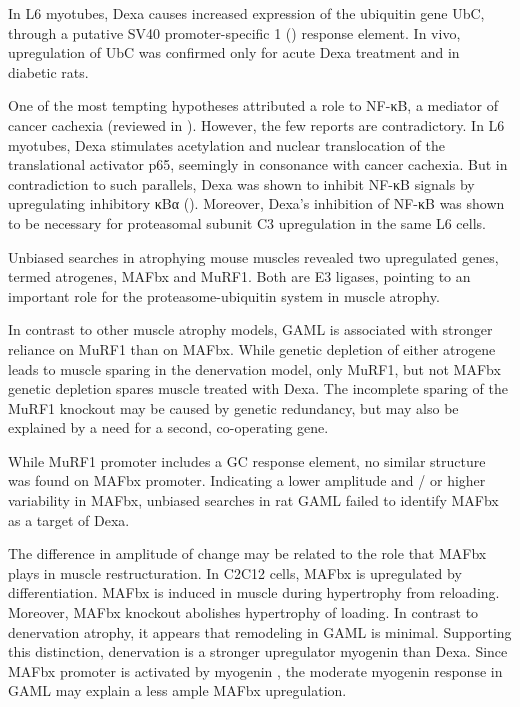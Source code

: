 \documentclass[12pt,english]{report}\usepackage[]{graphicx}\usepackage[]{color}
\begin{document}
In L6 myotubes, Dexa causes increased expression of the ubiquitin
gene UbC, through a putative SV40 promoter-specific 1 ()
response element\citep{marinovic2000tools}. In vivo, upregulation
of UbC was confirmed only for acute Dexa treatment\citep{wing1993glucocorticoids}
and in diabetic rats\citep{zheng2010foxo3a}.

One of the most tempting hypotheses attributed a role to NF-κB, a
mediator of cancer cachexia (reviewed in \citep{tisdale2008catabolic}).
However, the few reports are contradictory. In L6 myotubes, Dexa stimulates
acetylation and nuclear translocation of the translational activator
p65\citep{chamberlain2012multiple}, seemingly in consonance with
cancer cachexia. But in contradiction to such parallels, Dexa was
shown to inhibit NF-κB signals by upregulating inhibitory κBα ()\citep{luo2001heat}.
Moreover, Dexa's inhibition of NF-κB was shown to be necessary for
proteasomal subunit C3 upregulation in the same L6 cells\citep{du2000glucocorticoids}.

Unbiased searches in atrophying mouse muscles revealed two upregulated
genes, termed atrogenes, MAFbx and MuRF1\citep{bodine2001identification}.
Both are E3 ligases, pointing to an important role for the proteasome-ubiquitin
system in muscle atrophy.

In contrast to other muscle atrophy models, GAML is associated with
stronger reliance on MuRF1 than on MAFbx. While genetic depletion
of either atrogene leads to muscle sparing in the denervation model\citep{bodine2001identification},
only MuRF1, but not MAFbx genetic depletion spares muscle treated
with Dexa\citep{baehr2011muscle}. The incomplete sparing of the MuRF1
knockout may be caused by genetic redundancy, but may also be explained
by a need for a second, co-operating gene.

While MuRF1 promoter includes a GC response element, no similar structure
was found on MAFbx promoter\citep{waddell2008glucocorticoid,braun2015regulation}.
Indicating a lower amplitude and / or higher variability in MAFbx,
unbiased searches in rat GAML failed to identify MAFbx as a target
of Dexa\citep{wu2010redd1}.

The difference in amplitude of change may be related to the role that
MAFbx plays in muscle restructuration. In C2C12 cells, MAFbx is upregulated
by differentiation\citep{nishimura2008effects}. MAFbx is induced
in muscle during hypertrophy from reloading\citep{slimani2012worsening}.
Moreover, MAFbx knockout abolishes hypertrophy of loading\citep{baehr2014muscle}.
In contrast to denervation atrophy, it appears that remodeling in
GAML is minimal. Supporting this distinction, denervation is a stronger
upregulator myogenin than Dexa\citep{mozaffar2007molecular}. Since
MAFbx promoter is activated by myogenin \citep{moresi2010myogenin},
the moderate myogenin response in GAML may explain a less ample MAFbx
upregulation.
\end{document}
